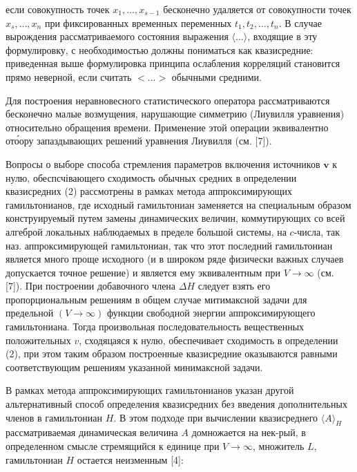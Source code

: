 \documentclass[10pt]{article}
\begin{document}
если совокупность точек $x_{1}, \ldots, x_{s-1}$ бесконечно удаляется от совокупности точек $x_{s}, \ldots, x_{n}$ при фиксированных временных переменных $t_{1}, t_{2}, \ldots, t_{n}$. В случае вырождения рассматриваемого состояния выражения $\langle\ldots\rangle$, входящие в эту формулировку, с необходимостью должны пониматься как квазисредние: приведенная выше формулировка принципа ослабления корреляций становится прямо неверной, если считать $<. . .>$ обычными средними.



Для построения неравновесного статистического оператора рассматриваются бесконечно малые возмущения, нарушающие симметрию (Лиувилля уравнения) относительно обращения времени. Применение этой операции эквивалентно ото́ору запаздывающих решений уравнения Лиувилля (см. [7]).



Вопросы о выборе способа стремления параметров включения источников $\boldsymbol{v}$ к нулю, обеспсчівающего сходимость обычных средних в определении квазисредних (2) рассмотрены в рамках метода аппроксимирующих гамильтонианов, где исходный гамильтониан заменяется на специальным образом конструируемый путем замены динамических величин, коммутирующих со всей алгеброй локальных наблюдаемых в пределе большой системы, на $c$-числа, так наз. аппроксимирующеӥ гамильтониан, так что этот последний гамильтониан является много проще исходного (и в широком ряде физически важных случаев допускается точное решение) и является ему эквивалентным при $V \rightarrow \infty$ (см. [7]). При построении добавочного члена $\Delta H$ следует взять его пропорциональным решениям в общем случае митимаксной задачи для предельной $(V \rightarrow \infty)$ функции свободной энергии аппроксимирующего гамильтониана. Тогда произвольная последовательность вещественных положительных $v$, сходяцаяся к нулю, обеспечивает сходимость в определении (2), при этом таким образом построенные квазисредние оказываются равными соответствующим решениям указанной минимаксной задачи.



В рамках метода аппроксимирующих гамильтонианов указан другой альтернативный способ определения квазисредних без введения дополнительных членов в гамильтониан $H$. В этом подходе при вычислении квазисреднего $\langle A\rangle_{H}$ рассматриваемая динамическая величина $A$ домножается на нек-рый, в определенном смысле стремящийся к единице при $V \rightarrow \infty$, множитель $L$, гамильтониан $H$ остается неизменным [4]:
\end{document}
